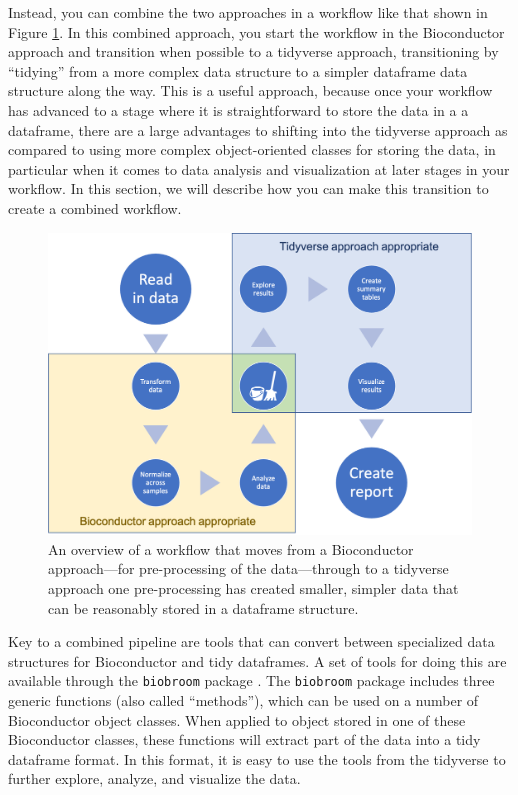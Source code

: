 \documentclass[]{tufte-book}
\begin{document}
Instead, you can combine the two approaches in a workflow like that shown in
Figure \ref{fig:combinedworkflow}. In this combined approach, you start the
workflow in the Bioconductor approach and transition when possible to a
tidyverse approach, transitioning by ``tidying'' from a more complex data
structure to a simpler dataframe data structure along the way. This is a useful
approach, because once your workflow has advanced to a stage where it is
straightforward to store the data in a a dataframe, there are a large advantages
to shifting into the tidyverse approach as compared to using more complex
object-oriented classes for storing the data, in particular when it comes to
data analysis and visualization at later stages in your workflow. In this
section, we will describe how you can make this transition to create a combined
workflow.

\begin{figure}
\includegraphics[width=\textwidth]{figures/workflow} \caption[An overview of a workflow that moves from a Bioconductor approach---for pre-processing of the data---through to a tidyverse approach one pre-processing has created smaller, simpler data that can be reasonably stored in a dataframe structure]{An overview of a workflow that moves from a Bioconductor approach---for pre-processing of the data---through to a tidyverse approach one pre-processing has created smaller, simpler data that can be reasonably stored in a dataframe structure.}\label{fig:combinedworkflow}
\end{figure}

Key to a combined pipeline are tools that can convert between specialized data
structures for Bioconductor and tidy dataframes. A set of tools for doing this
are available through the \texttt{biobroom} package \citep{biobroom}. The \texttt{biobroom} package
includes three generic functions (also called ``methods''), which can be used
on a number of Bioconductor object classes. When applied to object stored in one
of these Bioconductor classes, these functions will extract part of the data
into a tidy dataframe format. In this format, it is easy to use the tools from
the tidyverse to further explore, analyze, and visualize the data.
\end{document}
